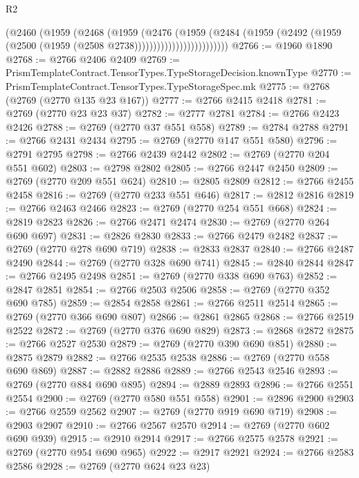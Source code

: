 \begin{lexlean}{R2}
\begin{coremodule}
                            (@2460
                              (@1959
                                (@2468
                                  (@1959
                                    (@2476
                                      (@1959
                                        (@2484
                                          (@1959
                                            (@2492
                                              (@1959
                                                (@2500 (@1959 (@2508 @2738)))))))))))))))))))))))))
@2766 := @1960 @1890
@2768 := @2766 @2406 @2409
@2769 := PrismTemplateContract.TensorTypes.TypeStorageDecision.knownType
@2770 := PrismTemplateContract.TensorTypes.TypeStorageSpec.mk
@2775 := @2768 (@2769 (@2770 @135 @23 @167))
@2777 := @2766 @2415 @2418
@2781 := @2769 (@2770 @23 @23 @37)
@2782 := @2777 @2781
@2784 := @2766 @2423 @2426
@2788 := @2769 (@2770 @37 @551 @558)
@2789 := @2784 @2788
@2791 := @2766 @2431 @2434
@2795 := @2769 (@2770 @147 @551 @580)
@2796 := @2791 @2795
@2798 := @2766 @2439 @2442
@2802 := @2769 (@2770 @204 @551 @602)
@2803 := @2798 @2802
@2805 := @2766 @2447 @2450
@2809 := @2769 (@2770 @209 @551 @624)
@2810 := @2805 @2809
@2812 := @2766 @2455 @2458
@2816 := @2769 (@2770 @233 @551 @646)
@2817 := @2812 @2816
@2819 := @2766 @2463 @2466
@2823 := @2769 (@2770 @254 @551 @668)
@2824 := @2819 @2823
@2826 := @2766 @2471 @2474
@2830 := @2769 (@2770 @264 @690 @697)
@2831 := @2826 @2830
@2833 := @2766 @2479 @2482
@2837 := @2769 (@2770 @278 @690 @719)
@2838 := @2833 @2837
@2840 := @2766 @2487 @2490
@2844 := @2769 (@2770 @328 @690 @741)
@2845 := @2840 @2844
@2847 := @2766 @2495 @2498
@2851 := @2769 (@2770 @338 @690 @763)
@2852 := @2847 @2851
@2854 := @2766 @2503 @2506
@2858 := @2769 (@2770 @352 @690 @785)
@2859 := @2854 @2858
@2861 := @2766 @2511 @2514
@2865 := @2769 (@2770 @366 @690 @807)
@2866 := @2861 @2865
@2868 := @2766 @2519 @2522
@2872 := @2769 (@2770 @376 @690 @829)
@2873 := @2868 @2872
@2875 := @2766 @2527 @2530
@2879 := @2769 (@2770 @390 @690 @851)
@2880 := @2875 @2879
@2882 := @2766 @2535 @2538
@2886 := @2769 (@2770 @558 @690 @869)
@2887 := @2882 @2886
@2889 := @2766 @2543 @2546
@2893 := @2769 (@2770 @884 @690 @895)
@2894 := @2889 @2893
@2896 := @2766 @2551 @2554
@2900 := @2769 (@2770 @580 @551 @558)
@2901 := @2896 @2900
@2903 := @2766 @2559 @2562
@2907 := @2769 (@2770 @919 @690 @719)
@2908 := @2903 @2907
@2910 := @2766 @2567 @2570
@2914 := @2769 (@2770 @602 @690 @939)
@2915 := @2910 @2914
@2917 := @2766 @2575 @2578
@2921 := @2769 (@2770 @954 @690 @965)
@2922 := @2917 @2921
@2924 := @2766 @2583 @2586
@2928 := @2769 (@2770 @624 @23 @23)

\end{coremodule}
\end{lexlean}
